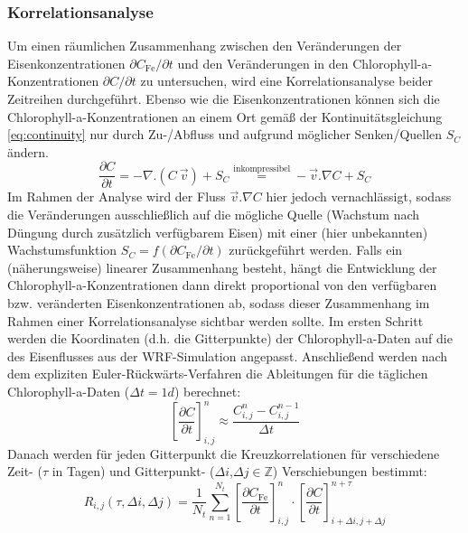 \documentclass[12pt,a4paper,onecolumn]{scrartcl}
\begin{document}
\subsubsection{Korrelationsanalyse} \label{sec:methods_correlation}
Um einen räumlichen Zusammenhang zwischen den Veränderungen der Eisenkonzentrationen $\partial C_\text{Fe} / \partial t$ und den Veränderungen in den Chlorophyll-a-Konzentrationen $\partial C / \partial t$ zu untersuchen, wird eine Korrelationsanalyse beider Zeitreihen durchgeführt. Ebenso wie die Eisenkonzentrationen können sich die Chlorophyll-a-Konzentrationen an einem Ort gemäß der Kontinuitätsgleichung \ref{eq:continuity} nur durch Zu-/Abfluss und aufgrund möglicher Senken/Quellen $S_C$ ändern.
\begin{equation}
\frac{\partial C}{\partial t} = - \nabla . (C \ \vec{v}) + S_C  \overset{\text{inkompressibel}}{=} - \vec{v}.\nabla C + S_C \label{eq:continuity}
\end{equation}
Im Rahmen der Analyse wird der Fluss $\vec{v}.\nabla C$ hier jedoch vernachlässigt, sodass die Veränderungen ausschließlich auf die mögliche Quelle (Wachstum nach Düngung durch zusätzlich verfügbarem Eisen) mit einer (hier unbekannten) Wachstumsfunktion $S_C = f(\partial C_\text{Fe} / \partial t)$ zurückgeführt werden. Falls ein (näherungsweise) linearer Zusammenhang besteht, hängt die Entwicklung der Chlorophyll-a-Konzentrationen dann direkt proportional von den verfügbaren bzw. veränderten Eisenkonzentrationen ab, sodass dieser Zusammenhang im Rahmen einer Korrelationsanalyse sichtbar werden sollte. Im ersten Schritt werden die Koordinaten (d.h. die Gitterpunkte) der Chlorophyll-a-Daten auf die des Eisenflusses aus der WRF-Simulation angepasst. Anschließend werden nach dem expliziten Euler-Rückwärts-Verfahren die Ableitungen für die täglichen Chlorophyll-a-Daten ($\Delta t = 1d$) berechnet:
\begin{equation}
\left[\frac{\partial C}{\partial t}\right]_{i,j}^{n} \approx \frac{C_{i,j}^n-C_{i,j}^{n-1}}{\Delta t}
\end{equation}
Danach werden für jeden Gitterpunkt die Kreuzkorrelationen für verschiedene Zeit- ($\tau$ in Tagen) und Gitterpunkt- ($\Delta i$,$\Delta j \in \mathbb{Z}$) Verschiebungen bestimmt:
\begin{equation}
R_{i,j}(\tau,\Delta i, \Delta j)= \frac{1}{N_t}\sum\limits_{n=1}^{N_t} \left[\frac{\partial C_\text{Fe}}{\partial t}\right]_{i,j}^n \cdot \left[\frac{\partial C}{\partial t}\right]_{i+\Delta i ,j+\Delta j}^{n+\tau}
\end{equation}
\end{document}
